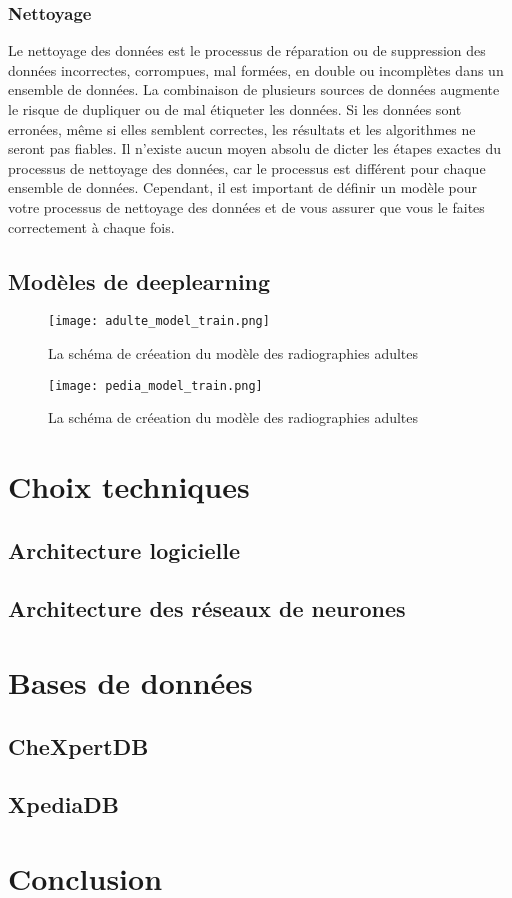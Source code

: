         \subsubsection{Nettoyage}
        Le nettoyage des données est le processus de réparation ou de suppression des données incorrectes, corrompues, mal formées, en double ou incomplètes dans un ensemble de données. La combinaison de plusieurs sources de données augmente le risque de dupliquer ou de mal étiqueter les données. Si les données sont erronées, même si elles semblent correctes, les résultats et les algorithmes ne seront pas fiables. Il n'existe aucun moyen absolu de dicter les étapes exactes du processus de nettoyage des données, car le processus est différent pour chaque ensemble de données. Cependant, il est important de définir un modèle pour votre processus de nettoyage des données et de vous assurer que vous le faites correctement à chaque fois.


   
    \subsection{Modèles de deeplearning}

    \begin{figure}[H]
        \centering
        \texttt{[image: adulte\_model\_train.png]}
        \caption{La schéma de créeation du modèle des radiographies adultes}\label{fig:adulte_model_schema}
    \end{figure}
    \begin{figure}[H]
        \centering
        \texttt{[image: pedia\_model\_train.png]}
        \caption{La schéma de créeation du modèle des radiographies adultes}\label{fig:pedia_model_schema}
    \end{figure}
\section{Choix techniques}

    \subsection{Architecture logicielle}

    \subsection{Architecture des réseaux de neurones}

\section{Bases de données}
    \subsection{CheXpertDB}\label{chexpertDB}
    \subsection{XpediaDB}

\section*{Conclusion}